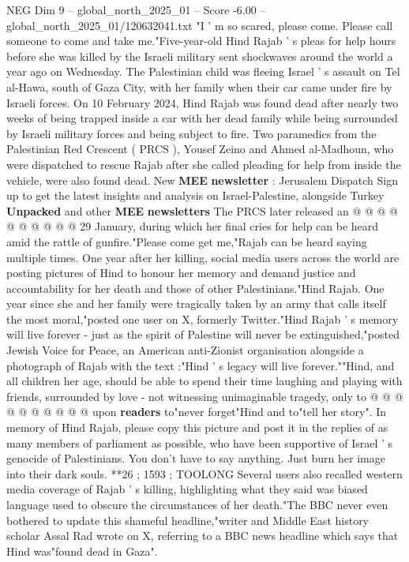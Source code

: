 \begin{textsample}{NEG Dim 9 – global\_north\_2025\_01 – Score -6.00 – global\_north\_2025\_01/120632041.txt}  \label{ex:f9_neg_099}
"I ' m so scared, please come.
Please call someone to come and take me."Five-year-old Hind Rajab ' s pleas for help hours before she was killed by the Israeli military sent shockwaves around the world a year ago on Wednesday.
The Palestinian child was fleeing Israel ' s assault on Tel al-Hawa, south of Gaza City, with her family when their car came under fire by Israeli forces.
On 10 February 2024, Hind Rajab was found dead after nearly two weeks of being trapped inside a car with her dead family while being surrounded by Israeli military forces and being subject to fire.
Two paramedics from the Palestinian Red Crescent ( PRCS ), Yousef Zeino and Ahmed al-Madhoun, who were dispatched to rescue Rajab after she called pleading for help from inside the vehicle, were also found dead.
New \textbf{MEE} \textbf{newsletter} : Jerusalem Dispatch Sign up to get the latest insights and analysis on Israel-Palestine, alongside Turkey \textbf{Unpacked} and other \textbf{MEE} \textbf{newsletters} The PRCS later released an @ @ @ @ @ @ @ @ @ @ 29 January, during which her final cries for help can be heard amid the rattle of gunfire."Please come get me,"Rajab can be heard saying multiple times.
One year after her killing, social media users across the world are posting pictures of Hind to honour her memory and demand justice and accountability for her death and those of other Palestinians."Hind Rajab.
One year since she and her family were tragically taken by an army that calls itself the most moral,"posted one user on X, formerly Twitter."Hind Rajab ' s memory will live forever - just as the spirit of Palestine will never be extinguished,"posted Jewish Voice for Peace, an American anti-Zionist organisation alongside a photograph of Rajab with the text :"Hind ' s legacy will live forever.""Hind, and all children her age, should be able to spend their time laughing and playing with friends, surrounded by love - not witnessing unimaginable tragedy, only to @ @ @ @ @ @ @ @ @ @ upon \textbf{readers} to"never forget"Hind and to"tell her story".
In memory of Hind Rajab, please copy this picture and post it in the replies of as many members of parliament as possible, who have been supportive of Israel ' s genocide of Palestinians.
You don't have to say anything.
Just burn her image into their dark souls. **26 ; 1593 ; TOOLONG Several users also recalled western media coverage of Rajab ' s killing, highlighting what they said was biased language used to obscure the circumstances of her death."The BBC never even bothered to update this shameful headline,"writer and Middle East history scholar Assal Rad wrote on X, referring to a BBC news headline which says that Hind was"found dead in Gaza".

\end{textsample}
